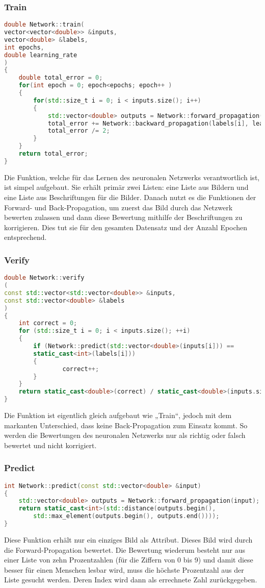 \subsubsection{Train}
\label{sec:RealTrainCode}
\begin{lstlisting}[language=c++]
double Network::train(
vector<vector<double>> &inputs, 
vector<double> &labels, 
int epochs, 
double learning_rate
) 
{
	double total_error = 0;
	for(int epoch = 0; epoch<epochs; epoch++ )
	{
		for(std::size_t i = 0; i < inputs.size(); i++) 
		{
			std::vector<double> outputs = Network::forward_propagation(inputs[i]);
			total_error += Network::backward_propagation(labels[i], learning_rate);
			total_error /= 2;
		}
	}
	return total_error;
}
\end{lstlisting}
Die Funktion, welche für das Lernen des neuronalen Netzwerks verantwortlich ist, ist simpel aufgebaut. Sie erhält primär zwei Listen: eine Liste aus Bildern und eine Liste aus Beschriftungen für die Bilder. Danach nutzt es die Funktionen der Forward- und Back-Propagation, um zuerst das Bild durch das Netzwerk bewerten zulassen und dann diese Bewertung mithilfe der Beschriftungen zu korrigieren. Dies tut sie für den gesamten Datensatz und der Anzahl Epochen entsprechend.

\subsubsection{Verify}
\label{sec:RealVerifyCode}
\begin{lstlisting}[language=c++]
double Network::verify
(
const std::vector<std::vector<double>> &inputs, 
const std::vector<double> &labels
) 
{
	int correct = 0;
	for (std::size_t i = 0; i < inputs.size(); ++i) 
	{
		if (Network::predict(std::vector<double>(inputs[i])) == 
		static_cast<int>(labels[i])) 
		{
				correct++;
		}
	}
	return static_cast<double>(correct) / static_cast<double>(inputs.size());
}
\end{lstlisting}
Die Funktion ist eigentlich gleich aufgebaut wie „Train“, jedoch mit dem markanten Unterschied, dass keine Back-Propagation zum Einsatz kommt. So werden die Bewertungen des neuronalen Netzwerks nur als richtig oder falsch bewertet und nicht korrigiert.

\subsubsection{Predict}
\label{sec:RealPredictCode}
\begin{lstlisting}[language=c++]
int Network::predict(const std::vector<double> &input) 
{
	std::vector<double> outputs = Network::forward_propagation(input);
	return static_cast<int>(std::distance(outputs.begin(), 
		std::max_element(outputs.begin(), outputs.end()))); 
}
\end{lstlisting}
Diese Funktion erhält nur ein einziges Bild als Attribut. Dieses Bild wird durch die Forward-Propagation bewertet. Die Bewertung wiederum besteht nur aus einer Liste von zehn Prozentzahlen (für die Ziffern von 0 bis 9) und damit diese besser für einen Menschen lesbar wird, muss die höchste Prozentzahl aus der Liste gesucht werden. Deren Index wird dann als errechnete Zahl zurückgegeben.

